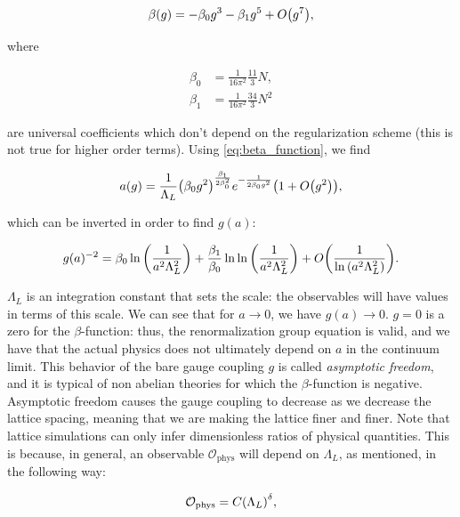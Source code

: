 \documentclass[reqno,12pt]{article}
\numberwithin{equation}{section}
\begin{document}
\begin{equation}
	\beta(g) = -\beta_0 g^3 - \beta_1 g^5 + O\qty(g^7),
\end{equation}

where

\begin{equation}
	\begin{aligned}
		\beta_0 &= \frac{1}{16\pi^2} \frac{11}{3}N, \\
		\beta_1 &= \frac{1}{16\pi^2}\frac{34}{3}N^2
	\end{aligned}
\end{equation}

are universal coefficients which don't depend on the regularization scheme (this is not true for higher order terms). Using
\eqref{eq:beta_function}, we find

\begin{equation}
	a(g) = \frac{1}{\Lambda_L} \qty(\beta_0 g^2)^{\frac{\beta_1}{2\beta_0^2}} e^{-\frac{1}{2\beta_0 g^2}} \qty(1 + O\qty(g^2)),
\end{equation}

which can be inverted in order to find $g(a)$:

\begin{equation}
	g(a)^{-2} = \beta_0 \ln \qty(\frac{1}{a^2 \Lambda_L^2}) + \frac{\beta_1}{\beta_0} \ln \ln \qty(\frac{1}{a^2 \Lambda_L^2})
	+ O\qty(\frac{1}{\ln \qty(a^2 \Lambda_L^2)}).
\end{equation}

$\Lambda_L$ is an integration constant that sets the scale: the observables will have values in terms of this scale.
We can see that for $a \rightarrow 0$, we have $g(a) \rightarrow 0$. $g = 0$ is a zero for the $\beta$-function: thus, the
renormalization group equation is valid, and we have that the actual physics does not ultimately depend on $a$ in the continuum limit.
This behavior of the bare gauge coupling $g$ is called \textit{asymptotic freedom}, and it is typical of non abelian theories
for which the $\beta$-function is negative. Asymptotic freedom causes the gauge coupling to decrease as we decrease
the lattice spacing, meaning that we are making the lattice finer and finer. Note that lattice simulations can only
infer dimensionless ratios of physical quantities. This is because, in general, an observable $\mathcal{O}_\text{phys}$
will depend on $\Lambda_L$, as mentioned, in the following way:

\begin{equation}
	\mathcal{O}_\text{phys} = C \qty(\Lambda_L)^\delta,
\end{equation}
\end{document}
